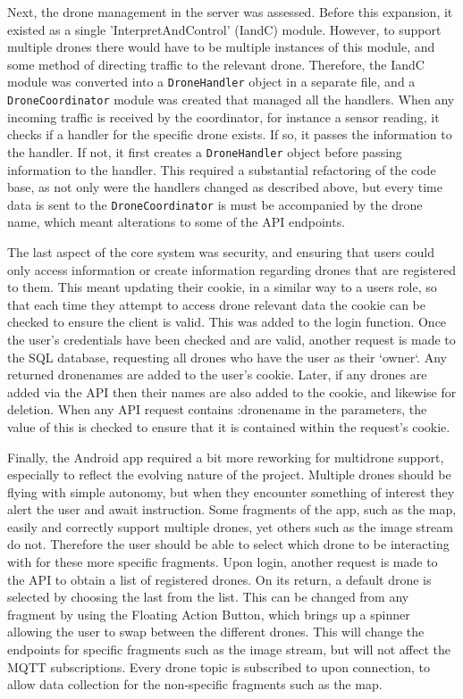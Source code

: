 \documentclass{article}
\begin{document}
Next, the drone management in the server was assessed. Before this expansion, it existed as a single 'InterpretAndControl' (IandC) module. However, to support multiple drones there would have to be multiple instances of this module, and some method of directing traffic to the relevant drone. Therefore, the IandC module was converted into a \texttt{DroneHandler} object in a separate file, and a \texttt{DroneCoordinator} module was created that managed all the handlers. When any incoming traffic is received by the coordinator, for instance a sensor reading, it checks if a handler for the specific drone exists. If so, it passes the information to the handler. If not, it first creates a \texttt{DroneHandler} object before passing information to the handler. This required a substantial refactoring of the code base, as not only were the handlers changed as described above, but every time data is sent to the \texttt{DroneCoordinator} is must be accompanied by the drone name, which meant alterations to some of the API endpoints.

The last aspect of the core system was security, and ensuring that users could only access information or create information regarding drones that are registered to them. This meant updating their cookie, in a similar way to a users role, so that each time they attempt to access drone relevant data the cookie can be checked to ensure the client is valid. This was added to the login function. Once the user's credentials have been checked and are valid, another request is made to the SQL database, requesting all drones who have the user as their `owner`. Any returned dronenames are added to the user's cookie. Later, if any drones are added via the API then their names are also added to the cookie, and likewise for deletion. When any API request contains :dronename in the parameters, the value of this is checked to ensure that it is contained within the request's cookie. 

Finally, the Android app required a bit more reworking for multidrone support, especially to reflect the evolving nature of the project. Multiple drones should be flying with simple autonomy, but when they encounter something of interest they alert the user and await instruction. Some fragments of the app, such as the map, easily and correctly support multiple drones, yet others such as the image stream do not. Therefore the user should be able to select which drone to be interacting with for these more specific fragments. Upon login, another request is made to the API to obtain a list of registered drones. On its return, a default drone is selected by choosing the last from the list. This can be changed from any fragment by using the Floating Action Button, which brings up a spinner allowing the user to swap between the different drones. This will change the endpoints for specific fragments such as the image stream, but will not affect the MQTT subscriptions. Every drone topic is subscribed to upon connection, to allow data collection for the non-specific fragments such as the map. 
\end{document}
